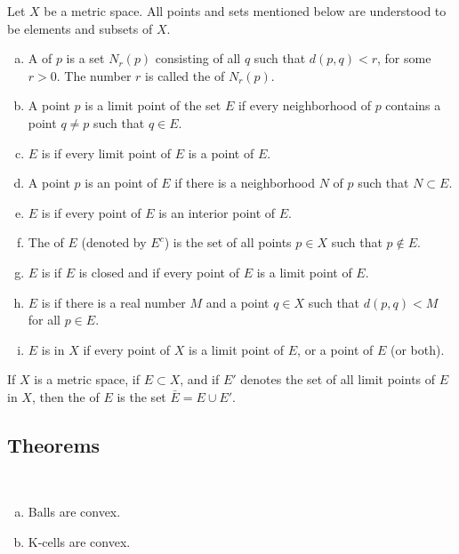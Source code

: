 \begin{deff}
	Let $X$ be a metric space. All points and sets mentioned below are understood to be elements and subsets of $X$.
	\begin{enumerate}[(a)]
		\item A {} of $p$ is a set $N_r(p)$ consisting of all $q$ such that $d(p,q) < r$, for some $r > 0$. The number $r$ is called the {} of $N_r(p)$.
		\item A point $p$ is a limit point of the set $E$ if every neighborhood of $p$ contains a point $q \ne p$ such that $q \in E$.
		\item $E$ is {} if every limit point of $E$ is a point of $E$.
		\item A point $p$ is an {} point of $E$ if there is a neighborhood $N$ of $p$ such that $N \subset E$.
		\item $E$ is {} if every point of $E$ is an interior point of $E$.
		\item The {} of $E$ (denoted by $E^c$) is the set of all points $p \in X$ such that $p \notin E$.
		\item $E$ is {} if $E$ is closed and if every point of $E$ is a limit point of $E$.
		\item $E$ is {} if there is a real number $M$ and a point $q \in X$ such that $d(p,q) < M$ for all $p \in E$.
		\item $E$ is {} in $X$ if every point of $X$ is a limit point of $E$, or a point of $E$ (or both).
	\end{enumerate}
\end{deff}

\begin{deff}
If $X$ is a metric space, if $E \subset X$, and if $E'$ denotes the set of all limit points of $E$ in $X$, then the {} of $E$ is the set $\bar E = E \cup E'$.
\end{deff}

\subsection{Theorems}
\begin{thm}
	~
	\begin{enumerate}[(a)]
	\item Balls are convex.
	\item K-cells are convex.
	\end{enumerate}
\end{thm}

